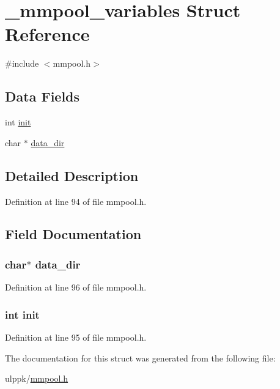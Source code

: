 \hypertarget{struct__mmpool__variables}{\section{\-\_\-mmpool\-\_\-variables Struct Reference}
\label{struct__mmpool__variables}
}


{\ttfamily \#include $<$mmpool.\-h$>$}

\subsection*{Data Fields}
\begin{DoxyCompactItemize}
\item 
int \hyperlink{struct__mmpool__variables_a795ea50921b36311ffd5e7baa2ef1f7e}{init}
\item 
char $\ast$ \hyperlink{struct__mmpool__variables_a12878be4d584d4841c7d409b8f024644}{data\-\_\-dir}
\end{DoxyCompactItemize}


\subsection{Detailed Description}


Definition at line 94 of file mmpool.\-h.



\subsection{Field Documentation}
\hypertarget{struct__mmpool__variables_a12878be4d584d4841c7d409b8f024644}{
\subsubsection[{data\-\_\-dir}]{\setlength{\rightskip}{0pt plus 5cm}char$\ast$ data\-\_\-dir}}\label{struct__mmpool__variables_a12878be4d584d4841c7d409b8f024644}


Definition at line 96 of file mmpool.\-h.

\hypertarget{struct__mmpool__variables_a795ea50921b36311ffd5e7baa2ef1f7e}{
\subsubsection[{init}]{\setlength{\rightskip}{0pt plus 5cm}int init}}\label{struct__mmpool__variables_a795ea50921b36311ffd5e7baa2ef1f7e}


Definition at line 95 of file mmpool.\-h.



The documentation for this struct was generated from the following file\-:\begin{DoxyCompactItemize}
\item 
ulppk/\hyperlink{mmpool_8h}{mmpool.\-h}\end{DoxyCompactItemize}
